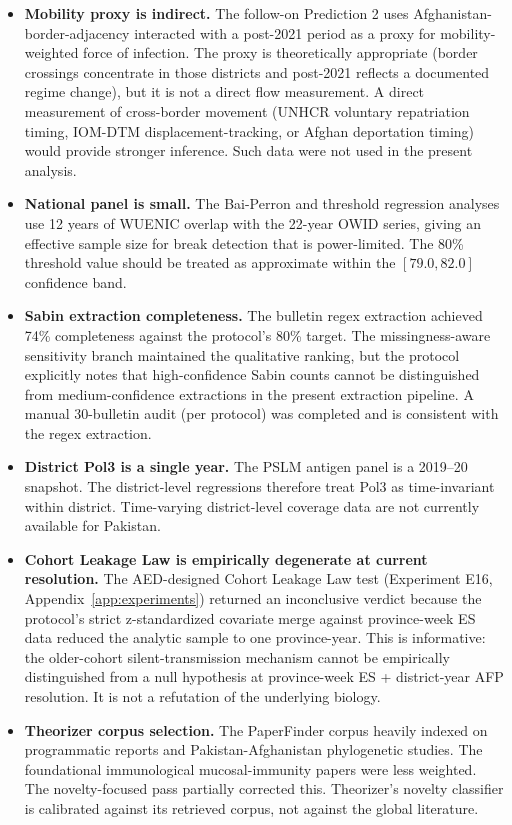 \documentclass[11pt]{article}
\begin{document}
\begin{itemize}[noitemsep]
\item \textbf{Mobility proxy is indirect.} The follow-on Prediction 2 uses Afghanistan-border-adjacency interacted with a post-2021 period as a proxy for mobility-weighted force of infection. The proxy is theoretically appropriate (border crossings concentrate in those districts and post-2021 reflects a documented regime change), but it is not a direct flow measurement. A direct measurement of cross-border movement (UNHCR voluntary repatriation timing, IOM-DTM displacement-tracking, or Afghan deportation timing) would provide stronger inference. Such data were not used in the present analysis.
\item \textbf{National panel is small.} The Bai-Perron and threshold regression analyses use 12 years of WUENIC overlap with the 22-year OWID series, giving an effective sample size for break detection that is power-limited. The 80\% threshold value should be treated as approximate within the $[79.0, 82.0]$ confidence band.
\item \textbf{Sabin extraction completeness.} The bulletin regex extraction achieved 74\% completeness against the protocol's 80\% target. The missingness-aware sensitivity branch maintained the qualitative ranking, but the protocol explicitly notes that high-confidence Sabin counts cannot be distinguished from medium-confidence extractions in the present extraction pipeline. A manual 30-bulletin audit (per protocol) was completed and is consistent with the regex extraction.
\item \textbf{District Pol3 is a single year.} The PSLM antigen panel is a 2019--20 snapshot. The district-level regressions therefore treat Pol3 as time-invariant within district. Time-varying district-level coverage data are not currently available for Pakistan.
\item \textbf{Cohort Leakage Law is empirically degenerate at current resolution.} The AED-designed Cohort Leakage Law test (Experiment E16, Appendix~\ref{app:experiments}) returned an inconclusive verdict because the protocol's strict z-standardized covariate merge against province-week ES data reduced the analytic sample to one province-year. This is informative: the older-cohort silent-transmission mechanism cannot be empirically distinguished from a null hypothesis at province-week ES + district-year AFP resolution. It is not a refutation of the underlying biology.
\item \textbf{Theorizer corpus selection.} The PaperFinder corpus heavily indexed on programmatic reports and Pakistan-Afghanistan phylogenetic studies. The foundational immunological mucosal-immunity papers were less weighted. The novelty-focused pass partially corrected this. Theorizer's novelty classifier is calibrated against its retrieved corpus, not against the global literature.
\end{itemize}
\end{document}
